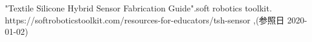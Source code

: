 \small
\begin{thebibliography}{99}
 "Textile Silicone Hybrid Sensor Fabrication \newline Guide".soft robotics toolkit. \newline https://softroboticstoolkit.com/resources-for-educators/tsh-sensor ,(参照日 2020-01-02)
\end{thebibliography}
\normalsize